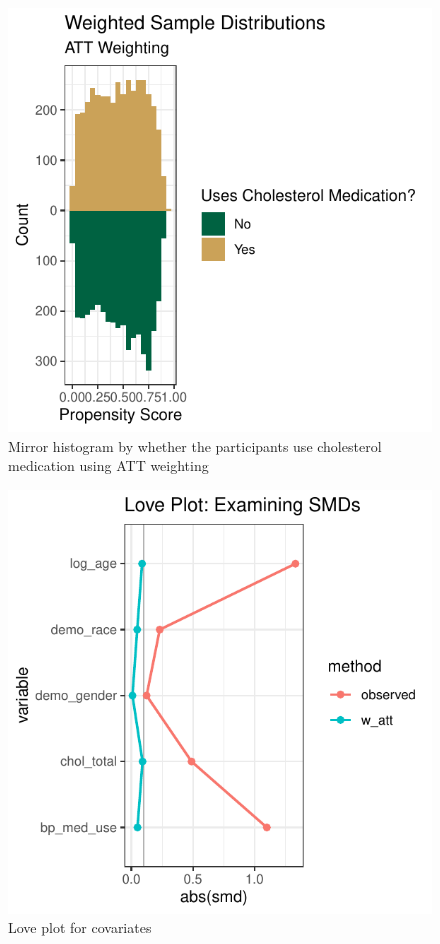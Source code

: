 \documentclass[useAMS,usenatbib,referee]{biom}
\begin{document}
\begin{figure}
\centering
\includegraphics{final-project_files/figure-latex/fig_diag2-1.pdf}
\caption{Mirror histogram by whether the participants use cholesterol
medication using ATT weighting}
\end{figure}

\begin{figure}
\centering
\includegraphics{final-project_files/figure-latex/fig_love-1.pdf}
\caption{Love plot for covariates}
\end{figure}
\end{document}
